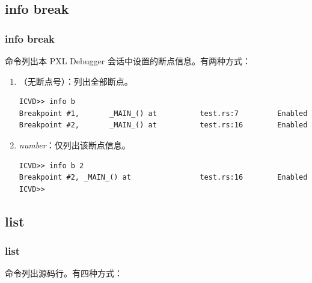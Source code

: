 \subsection{info break}
\subsubsection*{info break}

 命令列出本 PXL Debugger 会话中设置的断点信息。有两种方式：

\begin{enumerate}
  \item {}（无断点号）：列出全部断点。
\begin{lstlisting}
ICVD>> info b
Breakpoint #1,       _MAIN_() at          test.rs:7         Enabled
Breakpoint #2,       _MAIN_() at          test.rs:16        Enabled
\end{lstlisting}

  \item {} \textit{number}：仅列出该断点信息。
\begin{lstlisting}
ICVD>> info b 2
Breakpoint #2, _MAIN_() at                test.rs:16        Enabled
ICVD>>
\end{lstlisting}
\end{enumerate}

\subsection{list}
\subsubsection*{list}

 命令列出源码行。有四种方式：

